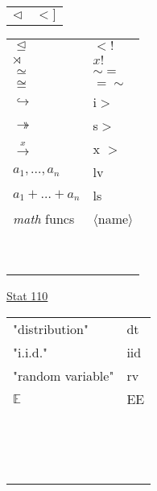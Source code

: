 \documentclass[10pt]{beamer}
\begin{document}
\begin{frame}
\begin{tabular}{ll}
$\triangleleft$ & $<]$ \\
\end{tabular}
\hspace*{1ex}
\vrule
\begin{tabular}{ll}
$\trianglelefteq$ & $<!$ \\
$\rtimes$ & $x!$ \\
$\simeq$ & $\sim=$ \\
$\cong$ & $=\sim$ \\
$\hookrightarrow$ & i$>$ \\
$\twoheadrightarrow$ & s$>$ \\
$\xrightarrow{x}$ & x $>$ \\
$a_1,\ldots,a_n$ & lv \\
$a_1+\ldots+a_n$ & ls \\
\textit{math} funcs & $\langle$name$\rangle$\\ %
\\
\\
\\
\\
\\
\\
\\
\\
\\
\end{tabular}

\end{frame}


\begin{frame}
\underline{Stat 110}

\begin{tabular}{ll}
"distribution" & dt \\
"i.i.d." & iid \\
"random variable" & rv \\
$\mathbb{E}$ & EE \\
\\
\\
\\
\\
\\
\\
\\
\\
\\
\\
\\
\\
\\
\\
\\
\end{tabular}

\end{frame}
\end{document}
